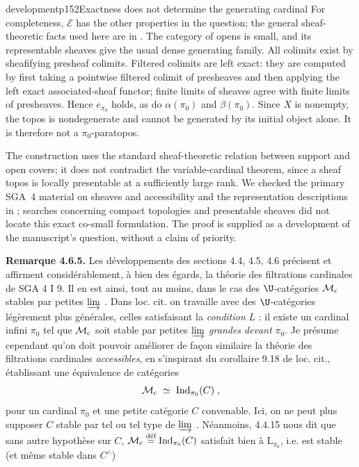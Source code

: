 \begin{dcomment}{development}{p152}{Exactness does not determine the generating cardinal}
For completeness, $\mathcal E$ has the other properties in the question; the general sheaf-theoretic facts used here are in \citet[Expos\'e~II, Theorem~4.1 and Corollary~4.1.1]{SGA4I1972}. The category of opens is small, and its representable sheaves give the usual dense generating family. All colimits exist by sheafifying presheaf colimits. Filtered colimits are left exact: they are computed by first taking a pointwise filtered colimit of presheaves and then applying the left exact associated-sheaf functor; finite limits of sheaves agree with finite limits of presheaves. Hence $e_{\pi_0}$ holds, as do $\alpha(\pi_0)$ and $\beta(\pi_0)$. Since $X$ is nonempty, the topos is nondegenerate and cannot be generated by its initial object alone. It is therefore not a $\pi_0$-paratopos.

The construction uses the standard sheaf-theoretic relation between support and open covers; it does not contradict the variable-cardinal theorem, since a sheaf topos is locally presentable at a sufficiently large rank. We checked the primary SGA~4 material on sheaves and accessibility and the representation descriptions in \citet{AdamekRosicky1994}; searches concerning compact topologies and presentable sheaves did not locate this exact co-small formulation. The proof is supplied as a development of the manuscript's question, without a claim of priority.
\end{dcomment}


\textbf{Remarque 4.6.5.} Les développements des sections 4.4, 4.5, 4.6 précisent et affirment considérablement, à bien des égards, la théorie des filtrations cardinales de SGA 4 I 9. Il en est ainsi, tout au moins, dans le cas des $\U$-catégories $\mathcal{M}_{\mathrm{c}}$ stables par petites $\varinjlim$ . Dans loc. cit. on travaille avec des $\U$-catégories légèrement plus générales, celles satisfaisant
la \textit{condition} $L$ : il existe un cardinal infini $\pi_0$ tel que $\mathcal{M}_{\mathrm{c}}$ soit stable par petites $\varinjlim$ \textit{grandes devant} $\pi_0$. Je présume cependant qu'on doit pouvoir améliorer de façon similaire la théorie des filtrations cardinales \textit{accessibles}, en s'inspirant du corollaire 9.18 de loc. cit., établissant une équivalence de catégories
\[
\mathcal{M}_{\mathrm{c}} \;\simeq\; \mathrm{Ind}_{\pi_0}(C)\;,
\]
pour un cardinal $\pi_0$ et une petite catégorie $C$ convenable. Ici, on ne peut plus supposer $C$ stable par tel ou tel type de $\varinjlim$ . Néanmoins, 4.4.15 nous dit que sans autre hypothèse sur $C$, $\mathcal{M}_{\mathrm{c}} \overset{\text{déf}}{=} \mathrm{Ind}_{\pi_0}(C)$ satisfait bien à $\mathrm{L}_{\pi_0}$, i.e. est stable (et même stable dans $C^{\wedge}$)

